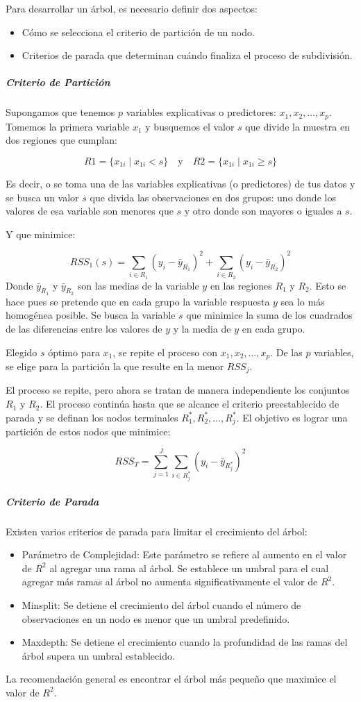Para desarrollar un árbol, es necesario definir dos aspectos:
\begin{itemize}
	\item Cómo se selecciona el criterio de partición de un nodo.
	\item Criterios de parada que determinan cuándo finaliza el proceso de subdivisión.
\end{itemize}


\subparagraph{Criterio de Partición}
Supongamos que tenemos \(p\) variables explicativas o predictores: \(x_1, x_2, \ldots, x_p\). Tomemos la primera variable \(x_1\) y busquemos el valor \(s\) que divide la muestra en dos regiones que cumplan:

\[
R1 = \{x_{1i} \mid x_{1i} < s\} \quad \text{y} \quad R2 = \{x_{1i} \mid x_{1i} \geq s\}
\]

Es decir, o se toma una de las variables explicativas (o predictores) de tus datos y se busca un valor $s$ que divida las observaciones en dos grupos: uno donde los valores de esa variable son menores que $s$ y otro donde son mayores o iguales a $s$.

Y que minimice:

\[
RSS_1(s) = \sum_{i \in R_1} (y_i - \bar{y}_{R_1})^2 + \sum_{i \in R_2} (y_i - \bar{y}_{R_2})^2
\]
Donde \(\bar{y}_{R_1}\) y \(\bar{y}_{R_2}\) son las medias de la variable \(y\) en las regiones \(R_1\) y \(R_2\). Esto se hace pues se pretende que en cada grupo la variable respuesta \(y\) sea lo más homogénea posible. Se busca la variable $s$ que minimice la suma de los cuadrados de las diferencias entre los valores de $y$ y la media de $y$ en cada grupo.

Elegido \(s\) óptimo para \(x_1\), se repite el proceso con \(x_1, x_2, \ldots, x_p\). De las \(p\) variables, se elige para la partición la que resulte en la menor \(RSS_j\).

El proceso se repite, pero ahora se tratan de manera independiente los conjuntos \(R_1\) y \(R_2\). El proceso continúa hasta que se alcance el criterio preestablecido de parada y se definan los nodos terminales \(R_1^*, R_2^*, \ldots, R_j^*\). El objetivo es lograr una partición de estos nodos que minimice:

\[
RSS_T = \sum_{j=1}^{J} \sum_{i \in R_j^*} (y_i - \bar{y}_{R_j^*})^2
\]

\subparagraph{Criterio de Parada}
Existen varios criterios de parada para limitar el crecimiento del árbol:
\begin{itemize}
	\item Parámetro de Complejidad: Este parámetro se refiere al aumento en el valor de \(R^2\) al agregar una rama al árbol. Se establece un umbral para el cual agregar más ramas al árbol no aumenta significativamente el valor de \(R^2\).
	\item Minsplit: Se detiene el crecimiento del árbol cuando el número de observaciones en un nodo es menor que un umbral predefinido.
	\item Maxdepth: Se detiene el crecimiento cuando la profundidad de las ramas del árbol supera un umbral establecido.
\end{itemize}
La recomendación general es encontrar el árbol más pequeño que maximice el valor de \(R^2\).


